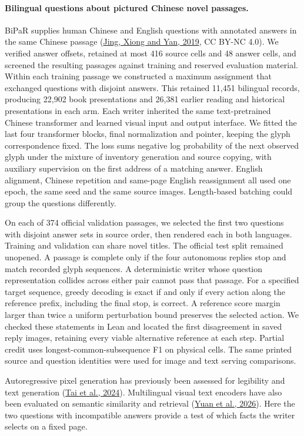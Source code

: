 \paragraph{Bilingual questions about pictured Chinese novel passages.}
BiPaR supplies human Chinese and English questions with annotated answers in the same Chinese passage (\href{https://aclanthology.org/D19-1249/}{Jing, Xiong and Yan, 2019}, CC BY-NC 4.0). We verified answer offsets, retained at most 416 source cells and 48 answer cells, and screened the resulting passages against training and reserved evaluation material. Within each training passage we constructed a maximum assignment that exchanged questions with disjoint answers. This retained 11,451 bilingual records, producing 22,902 book presentations and 26,381 earlier reading and historical presentations in each arm. Each writer inherited the same text-pretrained Chinese transformer and learned visual input and output interface. We fitted the last four transformer blocks, final normalization and pointer, keeping the glyph correspondence fixed. The loss sums negative log probability of the next observed glyph under the mixture of inventory generation and source copying, with auxiliary supervision on the first address of a matching answer. English alignment, Chinese repetition and same-page English reassignment all used one epoch, the same seed and the same source images. Length-based batching could group the questions differently.

On each of 374 official validation passages, we selected the first two questions with disjoint answer sets in source order, then rendered each in both languages. Training and validation can share novel titles. The official test split remained unopened. A passage is complete only if the four autonomous replies stop and match recorded glyph sequences. A deterministic writer whose question representation collides across either pair cannot pass that passage. For a specified target sequence, greedy decoding is exact if and only if every action along the reference prefix, including the final stop, is correct. A reference score margin larger than twice a uniform perturbation bound preserves the selected action. We checked these statements in Lean and located the first disagreement in saved reply images, retaining every viable alternative reference at each step. Partial credit uses longest-common-subsequence F1 on physical cells. The same printed source and question identities were used for image and text serving comparisons.

Autoregressive pixel generation has previously been assessed for legibility and text generation (\href{https://aclanthology.org/2024.findings-acl.874/}{Tai et al., 2024}). Multilingual visual text encoders have also been evaluated on semantic similarity and retrieval (\href{https://aclanthology.org/2026.emnlp-main.2412/}{Yuan et al., 2026}). Here the two questions with incompatible answers provide a test of which facts the writer selects on a fixed page.
